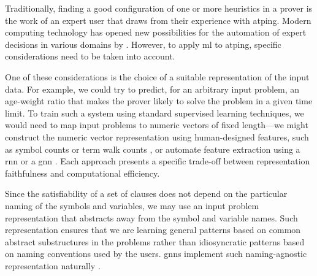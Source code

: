 Traditionally, finding a good configuration of one or more heuristics in a prover is the work of an expert user that draws from their experience with \gls{atping}.
Modern computing technology has opened new possibilities for the automation of expert decisions in various domains by  \cite{DBLP:books/lib/HastieTF09,DBLP:journals/nn/Schmidhuber15}.
However, to apply \gls{ml} to \gls{atping}, specific considerations need to be taken into account.


One of these considerations is the choice of a suitable representation of the input data.
For example, we could try to predict, for an arbitrary input problem, an age-weight ratio
that makes the prover likely to solve the problem in a given time limit.
To train such a system using standard supervised learning techniques,
we would need to map input problems to numeric vectors of fixed length---we might construct the numeric vector representation using human-designed features,
such as symbol counts or term walk counts \cite{DBLP:conf/mkm/JakubuvU17},
or automate feature extraction using a \gls{rnn} \cite{DBLP:conf/cade/ChvalovskyJ0U19,DBLP:conf/iclr/EvansSAKG18} or a \gls{gnn} \cite{DBLP:conf/cade/JakubuvCOP0U20,DBLP:journals/pami/AbdelazizCMACIK23}.
Each approach presents a specific trade-off between representation faithfulness and computational efficiency.

Since the satisfiability of a set of clauses does not depend on the particular naming of the symbols and variables,
we may use an input problem representation that abstracts away from the symbol and variable names.
Such representation ensures that we are learning general patterns based on common abstract substructures in the problems
rather than idiosyncratic patterns based on naming conventions used by the users.
\Glspl{gnn} implement such naming-agnostic representation naturally \cite{DBLP:conf/cade/JakubuvCOP0U20}.

